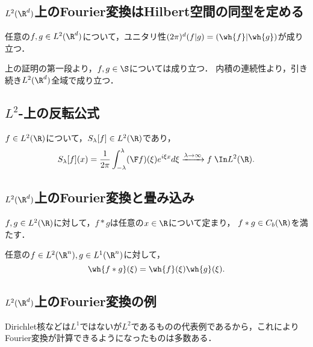 \documentclass[uplatex,dvipdfmx]{jsreport}
\begin{document}
\subsection{$L^2(\R^d)$上のFourier変換はHilbert空間の同型を定める}

\begin{corollary}[Parsevalの等式]
    任意の$f,g\in L^2(\R^d)$について，ユニタリ性$(2\pi)^d(f|g)=(\wh{f}|\wh{g})$が成り立つ．
\end{corollary}
\begin{Proof}
    上の証明の第一段より，$f,g\in\S$については成り立つ．
    内積の連続性より，引き続き$L^2(\R^d)$全域で成り立つ．
\end{Proof}

\subsection{$L^2$-上の反転公式}

\begin{proposition}
    $f\in L^2(\R)$について，$S_\lambda[f]\in L^2(\R)$であり，
    \[S_\lambda[f](x)=\frac{1}{2\pi}\int^\lambda_{-\lambda}(\F f)(\xi)e^{i\xi x}d\xi\xrightarrow{\lambda\to\infty}f\;\In L^2(\R).\]
\end{proposition}

\subsection{$L^2(\R^d)$上のFourier変換と畳み込み}

\begin{proposition}
    $f,g\in L^2(\R)$に対して，$f*g$は任意の$x\in\R$について定まり，
    $f*g\in C_b(\R)$を満たす．
\end{proposition}

\begin{theorem}
    任意の$f\in L^2(\R^n),g\in L^1(\R^n)$に対して，
    \[\wh{f*g}(\xi)=\wh{f}(\xi)\wh{g}(\xi).\]
\end{theorem}

\subsection{$L^2(\R^d)$上のFourier変換の例}

\begin{tcolorbox}[colframe=ForestGreen, colback=ForestGreen!10!white,breakable,colbacktitle=ForestGreen!40!white,coltitle=black,fonttitle=\bfseries\sffamily,
title=]
    Dirichlet核などは$L^1$ではないが$L^2$であるものの代表例であるから，これによりFourier変換が計算できるようになったものは多数ある．
\end{tcolorbox}
\end{document}
